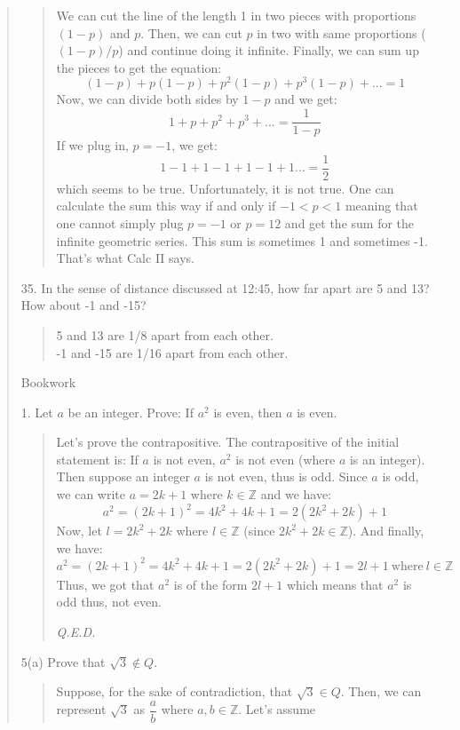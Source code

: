 \documentclass[12pt, a4paper]{article}                      %
\begin{document}
\begin{enumerate}
\begin{quote}
\begin{quote}
We can cut the line of the length 1 in two pieces with proportions $(1 - p)$ and $p$.
Then, we can cut $p$ in two with same proportions ($(1 - p) / p$) and continue doing it
infinite. Finally, we can sum up the pieces to get the equation:
$$(1-p) + p(1 - p) + p^2(1 - p) + p^3(1 - p) + ... = 1$$
Now, we can divide both sides by $1 - p$ and we get:
$$1 + p + p^2 + p^3 + ... = \dfrac{1}{1 - p}$$
If we plug in, $p = -1$, we get:
$$1 - 1 + 1 - 1 + 1 - 1 + 1 ... = \dfrac{1}{2}$$
which seems to be true. Unfortunately, it is not true. One can calculate
the sum this way if and only if $-1 < p < 1$ meaning that one cannot
simply plug $p = -1$ or $p = 12$ and get the sum for the infinite geometric
series. This sum is sometimes 1 and sometimes -1. That's what Calc II says.
\end{quote}
\item[35.]
In the sense of distance discussed at 12:45, how far apart are 5 and 13? How about
-1 and -15?
\begin{quote}
5 and 13 are 1/8 apart from each other.\\
-1 and -15 are 1/16 apart from each other.
\end{quote}
\newpage
{\Large Bookwork\\}
\item[1.]
Let $a$ be an integer. Prove: If $a^2$ is even, then $a$ is even.
\begin{quote}
Let's prove the contrapositive. The contrapositive of the initial
statement is: If $a$ is not even, $a^2$ is not even (where $a$ is an integer).
Then suppose an integer $a$ is not even, thus is odd. Since $a$ is odd, we can
write $a = 2k + 1$ where $k \in \mathbb{Z}$ and we have:
$$a^2 = (2k + 1)^2 = 4k^2 + 4k + 1 = 2 (2k^2 + 2k) + 1$$
Now, let $l = 2k^2 + 2k$ where $l \in \mathbb{Z}$ (since $2k^2 + 2k \in \mathbb{Z}$).
And finally, we have:
$$a^2 = (2k + 1)^2 = 4k^2 + 4k + 1 = 2 (2k^2 + 2k) + 1 = 2l + 1 \ \mbox{where} \ l \in \mathbb{Z}$$
Thus, we got that $a^2$ is of the form $2l + 1$ which means that $a^2$ is odd thus, not even.
\begin{flushright}
\textit{Q.E.D.}
\end{flushright}
\end{quote}
\item[5(a)]
Prove that $\sqrt{3} \notin Q$.
\begin{quote}
Suppose, for the sake of contradiction, that $\sqrt{3} \in Q$. Then, we can
represent $\sqrt{3}$ as $\dfrac{a}{b}$ where $a,b \in \mathbb{Z}$. Let's assume

\end{quote}
\end{quote}
\end{enumerate}
\end{document}
